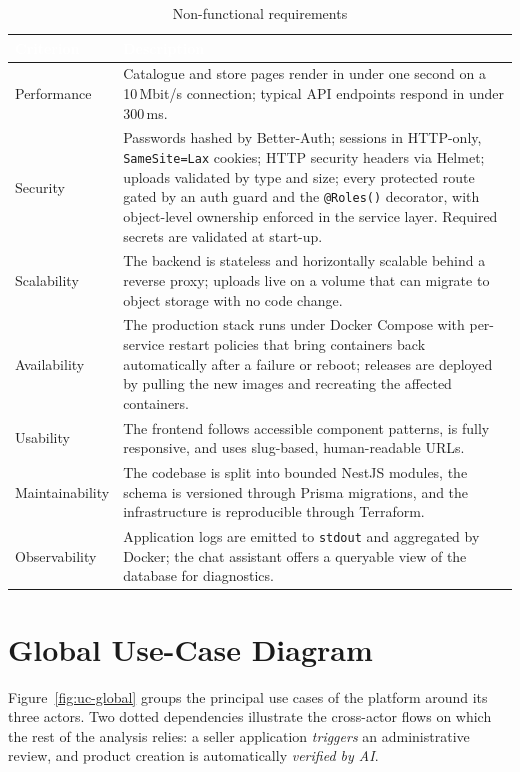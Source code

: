 \begin{table}[H]
  \centering
  \caption{Non-functional requirements}
  \label{tab:nfr}
  \begin{tabularx}{\textwidth}{|l|X|}
    \hline
    \rowcolor{tableHeader}
    \textcolor{white}{\textbf{Criterion}} & \textcolor{white}{\textbf{Description}} \\
    \hline
    Performance      & Catalogue and store pages render in under one second on a 10\,Mbit/s connection; typical API endpoints respond in under 300\,ms. \\ \hline
    Security         & Passwords hashed by Better-Auth; sessions in HTTP-only, \texttt{SameSite=Lax} cookies; HTTP security headers via Helmet; uploads validated by type and size; every protected route gated by an auth guard and the \texttt{@Roles()} decorator, with object-level ownership enforced in the service layer. Required secrets are validated at start-up. \\ \hline
    Scalability      & The backend is stateless and horizontally scalable behind a reverse proxy; uploads live on a volume that can migrate to object storage with no code change. \\ \hline
    Availability     & The production stack runs under Docker Compose with per-service restart policies that bring containers back automatically after a failure or reboot; releases are deployed by pulling the new images and recreating the affected containers. \\ \hline
    Usability        & The frontend follows accessible component patterns, is fully responsive, and uses slug-based, human-readable URLs. \\ \hline
    Maintainability  & The codebase is split into bounded NestJS modules, the schema is versioned through Prisma migrations, and the infrastructure is reproducible through Terraform. \\ \hline
    Observability    & Application logs are emitted to \texttt{stdout} and aggregated by Docker; the chat assistant offers a queryable view of the database for diagnostics. \\ \hline
  \end{tabularx}
\end{table}

\section{Global Use-Case Diagram}

Figure~\ref{fig:uc-global} groups the principal use cases of the
platform around its three actors. Two dotted dependencies illustrate the
cross-actor flows on which the rest of the analysis relies: a seller
application \emph{triggers} an administrative review, and product
creation is automatically \emph{verified by AI}.

